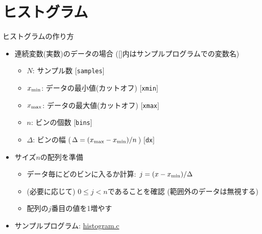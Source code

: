 \section{ヒストグラム}

\begin{frame}[t,fragile]{ヒストグラムの作り方}
  \begin{itemize}
  \item 連続変数(実数)のデータの場合 ([]内はサンプルプログラムでの変数名)
    \begin{itemize}
    \item $N$: サンプル数 [{\tt samples}]
    \item $x_{\rm min}$: データの最小値(カットオフ) [{\tt xmin}]
    \item $x_{\rm max}$: データの最大値(カットオフ) [{\tt xmax}]
    \item $n$: ビンの個数 [{\tt bins}]
    \item $\Delta$: ビンの幅 ($\Delta=(x_{\rm max}-x_{\rm min}) / n$) [{\tt dx}]
    \end{itemize}
  \item サイズ$n$の配列を準備
    \begin{itemize}
    \item データ毎にどのビンに入るか計算: $j = (x - x_{\rm min}) / \Delta$
    \item (必要に応じて) $0 \le j < n$であることを確認 (範囲外のデータは無視する)
    \item 配列の$j$番目の値を1増やす
    \end{itemize}
    \item サンプルプログラム: \href{https://github.com/todo-group/computer-experiments/blob/master/exercise/monte_carlo/histogram.c}{histogram.c}
  \end{itemize}
  \vspace*{-5cm} \hfill {}
\end{frame}

